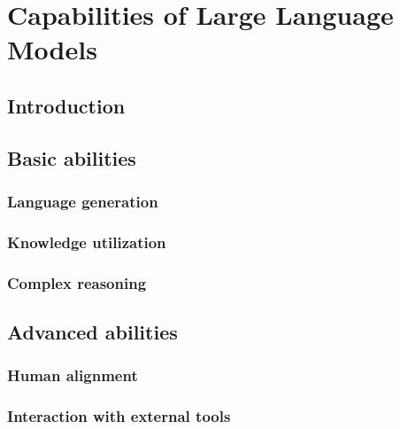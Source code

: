 
\chapter{Capabilities of Large Language Models}
\label{ch:capabilities}

\section{Introduction}
\label{sec:ch3-introduction}

\section{Basic abilities}
\label{sec:basic-abilities}

\subsection{Language generation}
\label{subsec:language-generation}

\subsection{Knowledge utilization}
\label{subsec:knowledge-utilization}

\subsection{Complex reasoning}
\label{subsec:complex-reasoning}

\section{Advanced abilities}
\label{sec:advanced-abilities}

\subsection{Human alignment}
\label{subsec:human-alignment}

\subsection{Interaction with external tools}
\label{subsec:interaction-with-external-tools}
